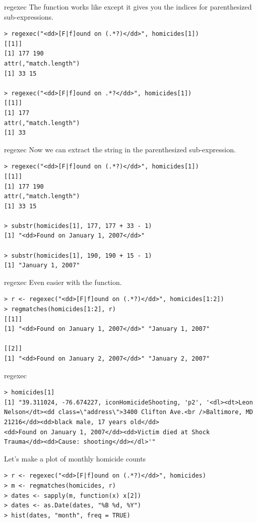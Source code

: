 \documentclass[aspectratio=169]{beamer}
\begin{document}
\begin{frame}[fragile]{regexec}
The  function works like  except it gives
you the indices for parenthesized sub-expressions.
\begin{verbatim}
> regexec("<dd>[F|f]ound on (.*?)</dd>", homicides[1])
[[1]]
[1] 177 190
attr(,"match.length")
[1] 33 15

> regexec("<dd>[F|f]ound on .*?</dd>", homicides[1])
[[1]]
[1] 177
attr(,"match.length")
[1] 33
\end{verbatim}
\end{frame}


\begin{frame}[fragile]{regexec}
  Now we can extract the string in the parenthesized sub-expression.
\begin{verbatim}
> regexec("<dd>[F|f]ound on (.*?)</dd>", homicides[1])
[[1]]
[1] 177 190
attr(,"match.length")
[1] 33 15

> substr(homicides[1], 177, 177 + 33 - 1)
[1] "<dd>Found on January 1, 2007</dd>"

> substr(homicides[1], 190, 190 + 15 - 1)
[1] "January 1, 2007"
\end{verbatim}
\end{frame}

\begin{frame}[fragile]{regexec}
Even easier with the  function.
\begin{verbatim}
> r <- regexec("<dd>[F|f]ound on (.*?)</dd>", homicides[1:2])
> regmatches(homicides[1:2], r)
[[1]]
[1] "<dd>Found on January 1, 2007</dd>" "January 1, 2007"                  

[[2]]
[1] "<dd>Found on January 2, 2007</dd>" "January 2, 2007"
\end{verbatim}
\end{frame}

\begin{frame}[fragile]{regexec}
\begin{verbatim}
> homicides[1]
[1] "39.311024, -76.674227, iconHomicideShooting, 'p2', '<dl><dt>Leon 
Nelson</dt><dd class=\"address\">3400 Clifton Ave.<br />Baltimore, MD 
21216</dd><dd>black male, 17 years old</dd>
<dd>Found on January 1, 2007</dd><dd>Victim died at Shock 
Trauma</dd><dd>Cause: shooting</dd></dl>'"
\end{verbatim}
Let's make a plot of monthly homicide counts
\begin{verbatim}
> r <- regexec("<dd>[F|f]ound on (.*?)</dd>", homicides)
> m <- regmatches(homicides, r)
> dates <- sapply(m, function(x) x[2])
> dates <- as.Date(dates, "%B %d, %Y")
> hist(dates, "month", freq = TRUE)
\end{verbatim}
\end{frame}
\end{document}
